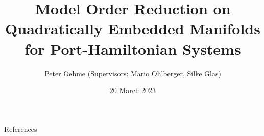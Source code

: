 

\author{Peter Oehme (Supervisors: Mario Ohlberger, Silke Glas)}
\title[MOR on Quadratically Embedded Manifolds for pH Systems]{Model Order Reduction on Quadratically Embedded Manifolds for Port-Hamiltonian Systems}
\date{20 March 2023}


    {
        \begin{frame}
            \maketitle
        \end{frame}
    }

    \begin{frame}
        \begin{minipage}{\textwidth}
            \tableofcontents
        \end{minipage}
    \end{frame}

    \setcounter{framenumber}{0} %

    
    
    
    

    \begin{frame}[allowframebreaks]{References}
        \def\newblock{}
        \printbibliography[
            heading=none
        ]
    \end{frame}

    
